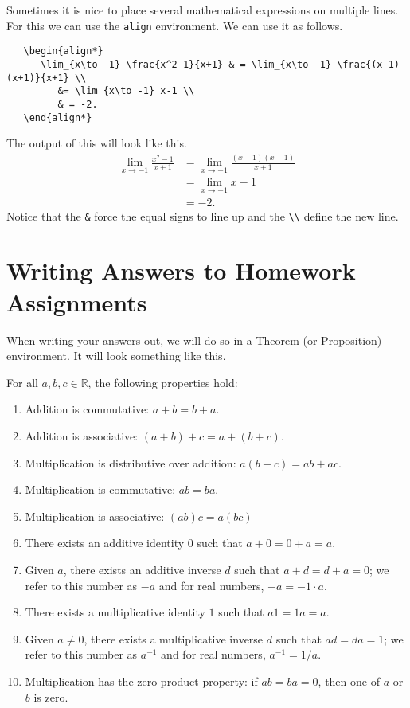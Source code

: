 \documentclass{amsart}
\begin{document}
   Sometimes it is nice to place several mathematical expressions on multiple lines. For this we can use the \verb|align| environment. We can use it as follows.
   \begin{verbatim}
   \begin{align*}
      \lim_{x\to -1} \frac{x^2-1}{x+1} & = \lim_{x\to -1} \frac{(x-1)(x+1)}{x+1} \\
         &= \lim_{x\to -1} x-1 \\
         & = -2.
   \end{align*}
   \end{verbatim}
   The output of this will look like this.
   \begin{align*}
      \lim_{x\to -1} \frac{x^2-1}{x+1} & = \lim_{x\to -1} \frac{(x-1)(x+1)}{x+1} \\
         &= \lim_{x\to -1} x-1 \\
         & = -2.
   \end{align*}
   Notice that the \verb|&| force the equal signs to line up and the \verb|\\| define the new line. 


\section{Writing Answers to Homework Assignments}

When writing your answers out, we will do so in a Theorem (or Proposition) environment. It will look something like this. 

\begin{prop*} For all $a,b,c \in \mathbb{R}$, the following properties hold:
\begin{enumerate}
\item Addition is commutative: $a+b = b+a$.
\item Addition is associative: $(a+b)+c = a+(b+c)$.
\item Multiplication is distributive over addition: $a(b+c) = ab + ac$.
\item Multiplication is commutative: $ab = ba$.
\item Multiplication is associative: $(ab)c=a(bc)$
\item There exists an additive identity $0$ such that $a + 0 = 0 + a = a$.
\item Given $a$, there exists an additive inverse $d$ such that $a+d = d+a = 0$; we refer to this number as $-a$ and for real numbers, $-a = -1\cdot a$.
\item There exists a multiplicative identity $1$ such that $a1 = 1a = a$.
\item Given $a \not = 0$, there exists a multiplicative inverse $d$ such that $ad = da = 1$; we refer to this number as $a^{-1}$ and for real numbers, $a^{-1} = 1/a$.
\item Multiplication has the zero-product property: if $ab = ba = 0$, then one of $a$ or $b$ is zero.
\end{enumerate}
\end{prop*}
 
\end{document}
